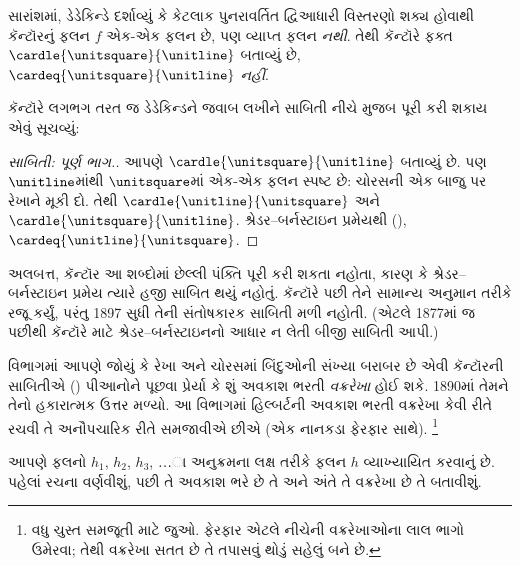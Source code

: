 સારાંશમાં, ડેડેકિન્ડે દર્શાવ્યું
કે કેટલાક પુનરાવર્તિત
દ્વિઆધારી વિસ્તરણો શક્ય હોવાથી
કૅન્ટૉરનું ફલન $f$
એક-એક ફલન છે, પણ
વ્યાપ્ત ફલન \emph{નથી}.
તેથી કૅન્ટૉરે ફક્ત
$\cardle{\unitsquare}{\unitline}$
બતાવ્યું છે,
$\cardeq{\unitsquare}{\unitline}$
\emph{નહીં}.

કૅન્ટૉરે લગભગ તરત જ
ડેડેકિન્ડને જવાબ લખીને
સાબિતી નીચે મુજબ
પૂરી કરી શકાય એવું સૂચવ્યું:

\begin{proof}[સાબિતી: પૂર્ણ ભાગ.]
આપણે $\cardle{\unitsquare}{\unitline}$
બતાવ્યું છે. પણ $\unitline$માંથી
$\unitsquare$માં એક-એક ફલન
સ્પષ્ટ છે: ચોરસની એક બાજુ
પર રેખાને મૂકી દો. તેથી
$\cardle{\unitline}{\unitsquare}$ અને
$\cardle{\unitsquare}{\unitline}$. શ્રેડર--બર્નસ્ટાઇન પ્રમેયથી
(),
$\cardeq{\unitline}{\unitsquare}$.
\end{proof}

અલબત્ત, કૅન્ટૉર આ શબ્દોમાં
છેલ્લી પંક્તિ પૂરી કરી શકતા
નહોતા, કારણ કે શ્રેડર--બર્નસ્ટાઇન
પ્રમેય ત્યારે હજી સાબિત થયું
નહોતું. કૅન્ટૉરે પછી તેને
સામાન્ય અનુમાન તરીકે રજૂ કર્યું,
પરંતુ 1897 સુધી તેની
સંતોષકારક સાબિતી મળી નહોતી.
(એટલે 1877માં જ પછીથી
કૅન્ટૉરે 
માટે શ્રેડર--બર્નસ્ટાઇનનો
આધાર ન લેતી બીજી
સાબિતી આપી.)
\endgroup

\begingroup
\makeatletter{}\makeatother


\label{guunit:OLP-0639}


 વિભાગમાં
આપણે જોયું કે રેખા અને
ચોરસમાં બિંદુઓની સંખ્યા
બરાબર છે એવી કૅન્ટૉરની
સાબિતીએ
()
પીઆનોને પૂછવા પ્રેર્યા કે
શું અવકાશ ભરતી
\emph{વક્રરેખા} હોઈ શકે.
1890માં તેમને તેનો
હકારાત્મક ઉત્તર મળ્યો.
આ વિભાગમાં હિલ્બર્ટની
અવકાશ ભરતી વક્રરેખા
કેવી રીતે રચવી તે
અનૌપચારિક રીતે
સમજાવીએ છીએ
(એક નાનકડા ફેરફાર સાથે).
\footnote{વધુ ચુસ્ત સમજૂતી
માટે \cite{Rose2010} જુઓ.
ફેરફાર એટલે નીચેની
વક્રરેખાઓના લાલ
ભાગો ઉમેરવા; તેથી
વક્રરેખા સતત છે તે
તપાસવું થોડું સહેલું બને છે.}

આપણે ફલનો $h_1$, $h_2$, $h_3$,
\dots{}ા અનુક્રમના
લક્ષ તરીકે ફલન $h$
વ્યાખ્યાયિત કરવાનું છે.
પહેલાં રચના વર્ણવીશું,
પછી તે અવકાશ ભરે છે
તે અને અંતે તે
વક્રરેખા છે તે બતાવીશું.

